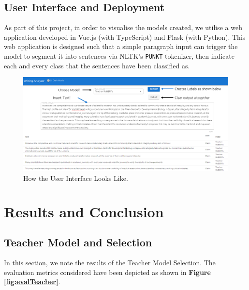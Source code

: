 \documentclass[12pt]{article}
\begin{document}
{\subsection{User Interface and Deployment}
As part of this project, in order to visualise the models created, we utilise a web application developed in Vue.js (with TypeScript) and Flask (with Python). This web application is designed such that a simple paragraph input can trigger the model to segment it into sentences via NLTK's \texttt{PUNKT} tokenizer, then indicate each and every class that the sentences have been classified as.
\begin{figure}[!ht]
    \begin{center}
        \includegraphics[scale=0.5]{images/userinterface.png}
        \caption{How the User Interface Looks Like.}
        \label{fig:userinterface}
    \end{center}
\end{figure}

\newpage
\section{Results and Conclusion}

\subsection{Teacher Model and Selection}
In this section, we note the results of the Teacher Model Selection. The evaluation metrics considered have been depicted as shown in \textbf{Figure \ref{fig:evalTeacher}}.

}
\end{document}
